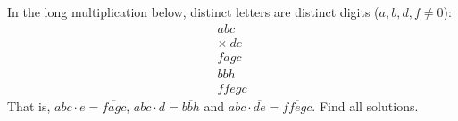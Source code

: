 In the long multiplication below, distinct letters are distinct digits ($a,b,d,f\ne0$):
\[\begin{array}{r}abc\\ \times\ de\\ \hline fagc\\ bbh\phantom{0}\\ \hline ffegc\end{array}\]
That is, $abc\cdot e=\overline{fagc}$, $abc\cdot d=\overline{bbh}$ and $abc\cdot\overline{de}=\overline{ffegc}$. Find all solutions.
